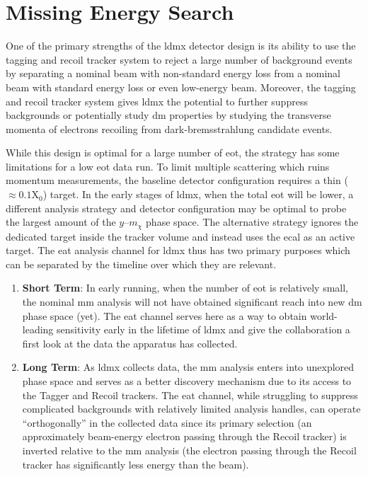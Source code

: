 \chapter{Missing Energy Search}
\label{chapter:ldmx:analysis}

One of the primary strengths of the \ac{ldmx} detector design is its ability to use the tagging and
recoil tracker system to reject a large number of background events by separating a nominal beam
with non-standard energy loss from a nominal beam with standard energy loss or even low-energy
beam. Moreover, the tagging and recoil tracker system gives \ac{ldmx} the potential to further
suppress backgrounds or potentially study \ac{dm} properties by studying the transverse momenta of
electrons recoiling from dark-bremsstrahlung candidate events.

While this design is optimal for a large number of \acf{eot}, the strategy has some limitations for
a low \ac{eot} data run. To limit multiple scattering which ruins momentum measurements, the
baseline detector configuration requires a thin ($\approx 0.1\mathrm{X}_0$) target. In the early
stages of \ac{ldmx}, when the total \ac{eot} will be lower, a different analysis strategy and
detector configuration may be optimal to probe the largest amount of the $y$--$m_\chi$ phase space.
The alternative
strategy ignores the dedicated target inside the tracker volume and instead uses the \ac{ecal}
as an active target. The \ac{eat} analysis channel for \ac{ldmx} thus has two primary purposes
which can be separated by the timeline over which they are relevant.
\begin{enumerate}
  \item \textbf{Short Term}: In early running, when the number of \ac{eot} is
        relatively small, the nominal \ac{mm} analysis will not have obtained
        significant reach into new \ac{dm} phase space (yet). The \ac{eat} channel
        serves here as a way to obtain world-leading sensitivity early in the lifetime
        of \ac{ldmx} and give the collaboration a first look at the data the apparatus
        has collected.
  \item \textbf{Long Term}: As \ac{ldmx} collects data, the \ac{mm}
        analysis enters into unexplored phase space and serves as a better discovery
        mechanism due to its access to the Tagger and Recoil trackers. The \ac{eat}
        channel, while struggling to suppress complicated backgrounds with relatively
        limited analysis handles, can operate ``orthogonally'' in the collected data
        since its primary selection (an approximately beam-energy electron passing
        through the Recoil tracker) is inverted relative to the \ac{mm} analysis
        (the electron passing through the Recoil tracker has significantly less
        energy than the beam).
\end{enumerate}

